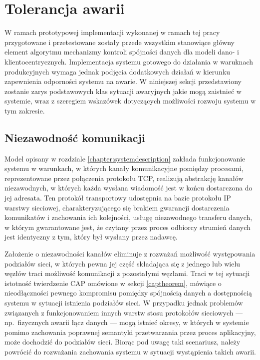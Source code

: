 \section{Tolerancja awarii} \label{section:faulttolerance}

W ramach prototypowej implementacji wykonanej w ramach tej pracy przygotowane i przetestowane zostały przede wszystkim stanowiące główny element algorytmu mechanizmy kontroli spójności danych dla modeli dano- i klientocentrycznych. Implementacja systemu gotowego do działania w waruknach produkcyjnych wymaga jednak podjęcia dodatkowych działań w kierunku zapewnienia odporności systemu na awarie. W niniejszej sekcji przedstawiony zostanie zarys podstawowych klas sytuacji awaryjnych jakie mogą zaistnieć w systemie, wraz z szeregiem wskazówek dotyczących możliwości rozwoju systemu w tym zakresie. 

\subsection*{Niezawodność komunikacji}

Model opisany w rozdziale \ref{chapter:systemdescription} zakłada funkcjonowanie systemu w warunkach, w których kanały komunikacyjne pomiędzy procesami, reprezentowane przez połączenia protokołu TCP, realizują abstrakcję kanałów niezawodnych, w których każda wysłana wiadomość jest w końcu dostarczona do jej adresata. Ten protokół transportowy udostępnia na bazie protokołu IP warstwy sieciowej, charakteryzującego się brakiem gwarancji dostarczenia komunikatów i zachowania ich kolejności, usługę niezawodnego transferu danych, w którym gwarantowane jest, że czytany przez proces odbiorcy strumień danych jest identyczny z tym, który był wysłany przez nadawcę.


Założenie o niezawodności kanałów eliminuje z rozważań możliwość występowania podziałów sieci, w
których pewna jej część składająca się z jednego lub wielu węzłów traci możliwość komunikacji z
pozostałymi węzłami. Traci w tej sytuacji istotność twierdzenie CAP omówione w sekcji
\ref{captheorem}, mówiące o nieodłączności pewnego kompromisu pomiędzy spójnością danych a
dostępnością systemu w sytuacji istnienia podziałów sieci. W przypadku jednak problemów związanych z
funkcjonowaniem innych warstw stosu protokołów sieciowych --- np.\ fizycznych awarii łącz danych --- mogą istnieć okresy, w których w systemie pomimo zachowania poprawnej semantyki przetwarzania przez proces aplikacyjny, może dochodzić do podziałów sieci. Biorąc pod uwagę taki scenariusz, należy powrócić do rozważania zachowania systemu w sytuacji wystąpienia takich awarii.

